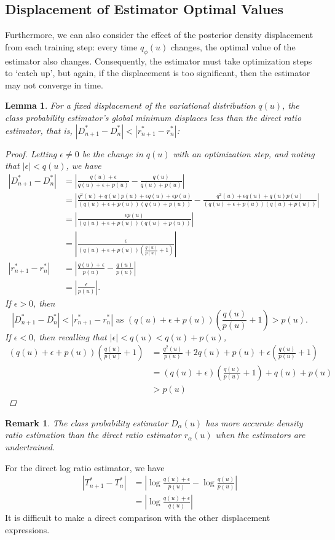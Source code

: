 \documentclass[honours,12pt]{unswthesis}
\newtheorem{lemma}[theorem]{Lemma}
\newtheorem{remark}[theorem]{Remark}
\numberwithin{equation}{section}
\theoremstyle{definition}
\begin{document}
\subsection{Displacement of Estimator Optimal Values}
Furthermore, we can also consider the effect of the posterior density displacement from each training step: every time $q_\phi(u)$ changes, the optimal value of the estimator also changes. Consequently, the estimator must take optimization steps to `catch up', but again, if the displacement is too significant, then the estimator may not converge in time.
\begin{lemma}
For a fixed displacement of the variational distribution $q(u)$, the class probability estimator's global minimum displaces less than the direct ratio estimator, that is, $|D^*_{n+1}-D^*_{n}|<|r^*_{n+1}-r^*_{n}|$:
\begin{proof}
Letting $\epsilon\neq0$ be the change in $q(u)$ with an optimization step, and noting that $|\epsilon|<q(u)$, we have
\begin{align*}
|D^*_{n+1}-D^*_{n}|&=\left|\frac{q(u)+\epsilon}{q(u)+\epsilon+p(u)}-\frac{q(u)}{q(u)+p(u)}\right|\\
&=\left|\frac{q^2(u)+q(u)p(u)+\epsilon q(u)+\epsilon p(u)}{(q(u)+\epsilon+p(u))(q(u)+p(u))}-\frac{q^2(u)+\epsilon q(u)+q(u)p(u)}{(q(u)+\epsilon+p(u))(q(u)+p(u))}\right|\\
&=\left|\frac{\epsilon p(u)}{(q(u)+\epsilon+p(u))(q(u)+p(u))}\right|\\
&=\left|\frac{\epsilon}{(q(u)+\epsilon+p(u))\left(\frac{q(u)}{p(u)}+1\right)}\right|\\
|r^*_{n+1}-r^*_{n}|&=\left|\frac{q(u)+\epsilon}{p(u)}-\frac{q(u)}{p(u)}\right|\\
&=\left|\frac{\epsilon}{p(u)}\right|.
\end{align*}
If $\epsilon>0$, then
\[|D^*_{n+1}-D^*_{n}|<|r^*_{n+1}-r^*_{n}|\text{ as }(q(u)+\epsilon+p(u))\left(\frac{q(u)}{p(u)}+1\right)>p(u).\]
If $\epsilon<0$, then recalling that $|\epsilon| < q(u) < q(u)+p(u)$,
\begin{align*}
(q(u)+\epsilon+p(u))(\frac{q(u)}{p(u)}+1)&=\frac{q^2(u)}{p(u)}+2q(u)+p(u)+\epsilon \left(\frac{q(u)}{p(u)}+1\right)\\
&=(q(u)+\epsilon)\left(\frac{q(u)}{p(u)}+1\right)+q(u)+p(u)\\
&>p(u)
\end{align*}
\end{proof}
\end{lemma}
\begin{remark}
The class probability estimator $D_\alpha(u)$ has more accurate density ratio estimation than the direct ratio estimator $r_\alpha(u)$ when the estimators are undertrained.
\end{remark}
For the direct log ratio estimator, we have
\begin{align*}
|T^*_{n+1}-T^*_{n}|&=\left|\log \frac{q(u)+\epsilon}{p(u)}-\log \frac{q(u)}{p(u)}\right|\\
&=\left|\log \frac{q(u)+\epsilon}{q(u)}\right|
\end{align*}
It is difficult to make a direct comparison with the other displacement expressions.
\end{document}
